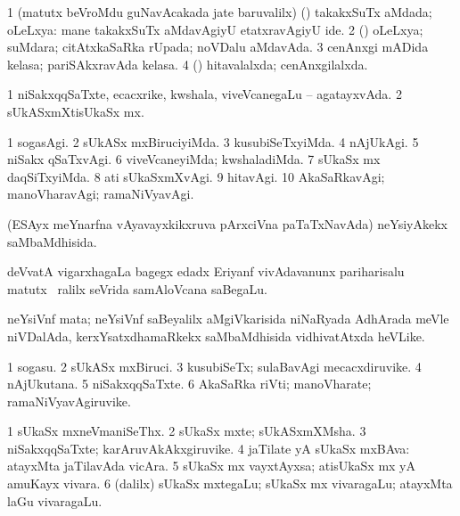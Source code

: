 \noindent
\gl{\pagu}
\bmng
\bnum
\num{1}  (matutx beVroMdu guNavAcakada jate baruvalilx) (\AmA) takakxSuTx aMdada; oLeLxya:  mane takakxSuTx aMdavAgiyU etatxravAgiyU ide. 
\num{2}  (\AmA) oLeLxya; suMdara; citAtxkaSaRka rUpada; noVDalu aMdavAda. 
\num{3}  cenAnxgi mADida kelasa; pariSAkxravAda kelasa. 
\num{4}  (\AmA) hitavalalxda; cenAnxgilalxda. 
\enum
\emng
\eentry

\bentry
{}
\gl{\gu}
\bmng
\bnum
\num{1} niSakxqqSaTxte, ecacxrike, kwshala, viveVcanegaLu -- agatayxvAda. 
\num{2} sUkASxmXtisUkaSx mx. 
\enum
\emng
\eentry

\bentry
{}
\gl{\kirxvi}
\bmng
\bnum
\num{1} sogasAgi. 
\num{2} sUkASx mxBiruciyiMda. 
\num{3} kusubiSeTxyiMda. 
\num{4} nAjUkAgi. 
\num{5} niSakx qSaTxvAgi. 
\num{6} viveVcaneyiMda; kwshaladiMda. 
\num{7} sUkaSx mx daqSiTxyiMda. 
\num{8} ati sUkaSxmXvAgi. 
\num{9} hitavAgi. 
\num{10} AkaSaRkavAgi; manoVharavAgi; ramaNiVyavAgi. 
\enum
\emng
\eentry

\bentry
{}
\gl{\gu}
\bmng
(ESAyx meYnarfna vAyavayxkikxruva pArxciVna paTaTxNavAda) neYsiyAkekx saMbaMdhisida. 
\emng

\noindent
\gl{\pagu}
\bmng
{} deVvatA vigarxhagaLa bagegx edadx Eriyanf vivAdavanunx pariharisalu \kirxpU\  matutx \kirxpU\ ralilx seVrida samAloVcana saBegaLu. 
\emng
\eentry

\bentry
{}
\gl{\nA}
\bmng
neYsiVnf mata; neYsiVnf saBeyalilx aMgiVkarisida niNaRyada AdhArada meVle niVDalAda, kerxYsatxdhamaRkekx saMbaMdhisida vidhivatAtxda heVLike. 
\emng
\eentry

\bentry
{}
\gl{\nA}
\bmng
\bnum
\num{1} sogasu. 
\num{2} sUkASx mxBiruci. 
\num{3} kusubiSeTx; sulaBavAgi mecacxdiruvike. 
\num{4} nAjUkutana. 
\num{5} niSakxqqSaTxte. 
\num{6} AkaSaRka riVti; manoVharate; ramaNiVyavAgiruvike. 
\enum
\emng
\eentry

\bentry
{}
\gl{\nA}
\bmng
\bnum
\num{1} sUkaSx mxneVmaniSeThx. 
\num{2} sUkaSx mxte; sUkASxmXMsha. 
\num{3} niSakxqqSaTxte; karAruvAkAkxgiruvike. 
\num{4} jaTilate yA sUkaSx mxBAva:  atayxMta jaTilavAda vicAra. 
\num{5} sUkaSx mx vayxtAyxsa; atisUkaSx mx yA amuKayx vivara. 
\num{6} (\bava dalilx) sUkaSx mxtegaLu; sUkaSx mx vivaragaLu; atayxMta laGu vivaragaLu. 
\enum
\emng
\eentry


